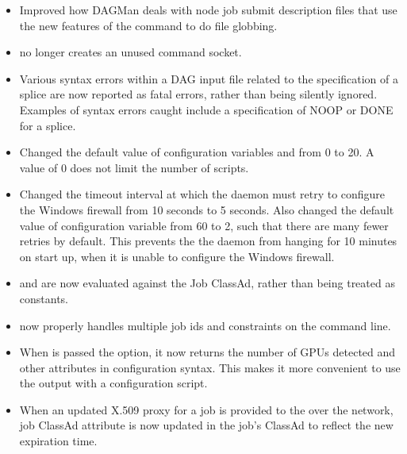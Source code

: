 \begin{itemize}
\item Improved how DAGMan deals with node job submit description files that
use the new features of the  command
to do file globbing.

\item {} no longer creates an unused command socket.

\item Various syntax errors within a DAG input file related to the 
specification of a splice are now reported as fatal errors, 
rather than being silently ignored.
Examples of syntax errors caught include a specification
of NOOP or DONE for a splice.
 

\item Changed the default value of configuration variables
 and 
from 0 to 20.
A value of 0 does not limit the number of scripts.

\item Changed the timeout interval at which the  daemon
must retry to configure the Windows firewall from 10 seconds to 5 seconds.
Also changed the default value of configuration variable
 from 60 to 2,
such that there are many fewer retries by default.
This prevents the the  daemon from hanging for 10 minutes 
on start up,
when it is unable to configure the Windows firewall.

\item {} and 
are now evaluated against the Job ClassAd,
rather than being treated as constants.

\item {} now properly handles multiple job ids and constraints on the command line.

\item When  is passed the  option,
it now returns the number of GPUs detected and other attributes in configuration syntax.
This makes it more convenient to use the output with a configuration script.

\item When an updated X.509 proxy for a job is provided to the
 over the network, 
job ClassAd attribute 
is now updated in the job's ClassAd to reflect the new expiration time.


\end{itemize}
